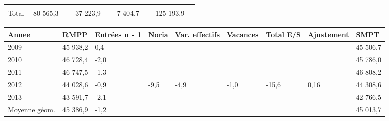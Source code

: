\begin{longtable}[]{@{}lllllllll@{}}
\begin{minipage}[t]{0.06\columnwidth}
\strut
\end{minipage} & \begin{minipage}[t]{0.12\columnwidth}\raggedright
\strut
\end{minipage} & \begin{minipage}[t]{0.06\columnwidth}\raggedright
\strut
\end{minipage} & \begin{minipage}[t]{0.09\columnwidth}\raggedright
\strut
\end{minipage} & \begin{minipage}[t]{0.06\columnwidth}\raggedright
\strut
\end{minipage}\tabularnewline
\begin{minipage}[t]{0.05\columnwidth}\raggedright
Total\strut
\end{minipage} & \begin{minipage}[t]{0.10\columnwidth}\raggedright
-80 565,3\strut
\end{minipage} & \begin{minipage}[t]{0.06\columnwidth}\raggedright
\strut
\end{minipage} & \begin{minipage}[t]{0.16\columnwidth}\raggedright
-37 223,9\strut
\end{minipage} & \begin{minipage}[t]{0.06\columnwidth}\raggedright
\strut
\end{minipage} & \begin{minipage}[t]{0.12\columnwidth}\raggedright
-7 404,7\strut
\end{minipage} & \begin{minipage}[t]{0.06\columnwidth}\raggedright
\strut
\end{minipage} & \begin{minipage}[t]{0.09\columnwidth}\raggedright
-125 193,9\strut
\end{minipage} & \begin{minipage}[t]{0.06\columnwidth}\raggedright
\strut
\end{minipage}\tabularnewline
\bottomrule
\end{longtable}

\begin{longtable}[]{@{}lllllllll@{}}
\toprule
Annee & RMPP & Entrées n - 1 & Noria & Var. effectifs & Vacances & Total
E/S & Ajustement & SMPT\tabularnewline
\midrule
\endhead
2009 & 45 938,2 & 0,4 & & & & & & 45 506,7\tabularnewline
2010 & 46 728,4 & -2,0 & & & & & & 45 786,0\tabularnewline
2011 & 46 747,5 & -1,3 & & & & & & 46 808,2\tabularnewline
2012 & 44 028,6 & -0,9 & -9,5 & -4,9 & -1,0 & -15,6 & 0,16 & 44
308,6\tabularnewline
2013 & 43 591,7 & -2,1 & & & & & & 42 766,5\tabularnewline
Moyenne géom. & 45 386,9 & -1,2 & & & & & & 45 013,7\tabularnewline
\bottomrule
\end{longtable}

